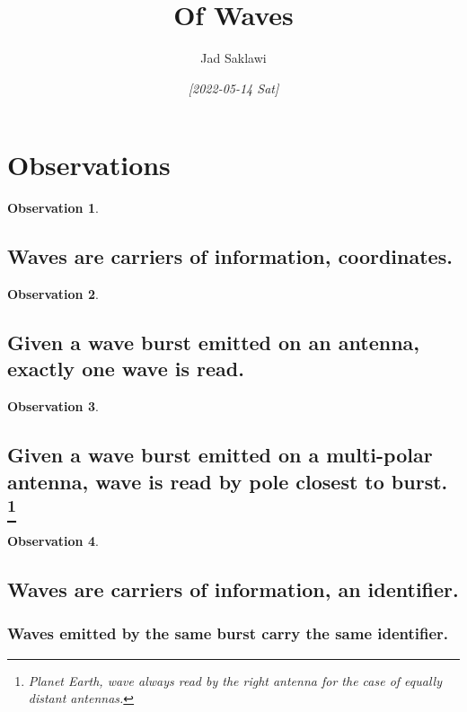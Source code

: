 \documentclass[11pt]{article}
\author{Jad Saklawi}
\date{\textit{[2022-05-14 Sat]}}
\title{Of Waves}
\begin{document}
\maketitle
\newtheorem*{observation}{Observation}
\theoremstyle{definition}
\newtheorem{definition}{Definition}[section]

\theoremstyle{example}
\newtheorem{example}{Example}[section]

\section{Observations}
\label{sec:orgb0eba0c}

\begin{observation}
\subsection{Waves are carriers of information, coordinates.}
\label{sec:org989a148}
\end{observation}

\begin{observation}
\subsection{Given a wave burst emitted on an antenna, exactly one wave is read.}
\label{sec:orgf365633}
\end{observation}

\begin{observation}
\subsection{Given a wave burst emitted on a multi-polar antenna, wave is read  by pole closest to burst. \footnote{Planet Earth, wave always read by the right antenna for the case of equally distant antennas.}}
\label{sec:orgfc142ce}
\end{observation} 

\begin{observation}
\subsection{Waves are carriers of information, an identifier.}
\label{sec:org0601300}
\subsubsection{Waves emitted by the same burst carry the same identifier.}
\label{sec:org05d489d}
\end{observation}
\end{document}
